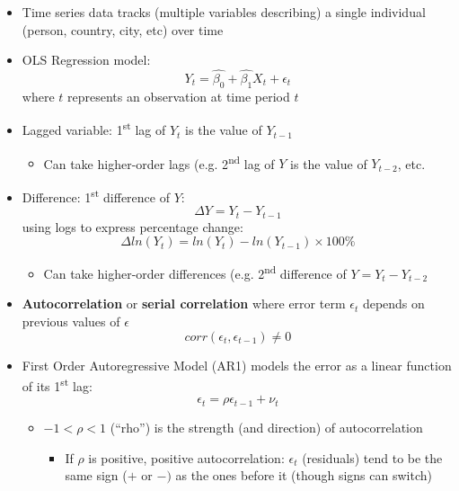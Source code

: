 \documentclass{article}
\begin{document}
\begin{itemize}
	\item Time series data tracks (multiple variables describing) a single individual (person, country, city, etc) over time
	\item OLS Regression model: 
		\begin{equation*}
		Y_t=\hat{\beta_0}+\hat{\beta_1} X_t+\epsilon_t
	\end{equation*}
	where $t$ represents an observation at time period $t$
	\item Lagged variable: 1\textsuperscript{st} lag of $Y_t$ is the value of $Y_{t-1}$
	\begin{itemize}
		\item Can take higher-order lags (e.g. 2\textsuperscript{nd} lag of $Y$ is the value of $Y_{t-2}$, etc. 	
	\end{itemize}
	\item Difference: 1\textsuperscript{st} difference of $Y$: 
	\begin{equation*}
	\Delta Y=Y_t - Y_{t-1}	
	\end{equation*}
	using logs to express percentage change: 
	\begin{equation*}
	\Delta ln(Y_t)=ln(Y_t)-ln(Y_{t-1}) \times 100\%
	\end{equation*}
	\begin{itemize}
		\item Can take higher-order differences (e.g. 2\textsuperscript{nd} difference of $Y=Y_t-Y_{t-2}$ 	
	\end{itemize}
	\item \textbf{Autocorrelation} or \textbf{serial correlation} where error term $\epsilon_t$ depends on previous values of $\epsilon$
	\begin{equation*}
	corr(\epsilon_t, \epsilon_{t-1})\neq 0	
	\end{equation*}
		\item First Order Autoregressive Model (AR1) models the error as a linear function of its 1\textsuperscript{st} lag:
		\begin{equation*}
		\epsilon_t= \rho \epsilon_{t-1}+\nu_t		
		\end{equation*}
  		\begin{itemize}
  			\item $-1<\rho<1$ (``rho'') is the strength (and direction) of autocorrelation   
  			\begin{itemize}
  					\item If $\rho$ is positive, positive autocorrelation: $\epsilon_t$ (residuals) tend to be the same sign ($+$ or $-)$ as the ones before it (though signs can switch)

\end{itemize}
\end{itemize}
\end{itemize}
\end{document}
